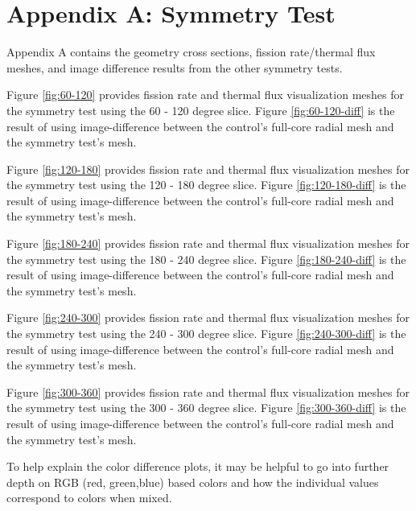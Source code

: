
\label{app}
\section{Appendix A: Symmetry Test}
Appendix A contains the geometry cross sections, fission rate/thermal flux meshes, and image difference results from the other symmetry tests.





Figure \ref{fig:60-120} provides fission rate and thermal flux visualization meshes for the symmetry test using the 60 - 120 degree slice.  Figure \ref{fig:60-120-diff} is the result of using image-difference between the control's full-core radial mesh and the symmetry test's mesh.




Figure \ref{fig:120-180} provides fission rate and thermal flux visualization meshes for the symmetry test using the 120 - 180 degree slice.  Figure \ref{fig:120-180-diff} is the result of using image-difference between the control's full-core radial mesh and the symmetry test's mesh.




Figure \ref{fig:180-240} provides fission rate and thermal flux visualization meshes for the symmetry test using the 180 - 240 degree slice.  Figure \ref{fig:180-240-diff} is the result of using image-difference between the control's full-core radial mesh and the symmetry test's mesh.




Figure \ref{fig:240-300} provides fission rate and thermal flux visualization meshes for the symmetry test using the 240 - 300 degree slice.  Figure \ref{fig:240-300-diff} is the result of using image-difference between the control's full-core radial mesh and the symmetry test's mesh.




Figure \ref{fig:300-360} provides fission rate and thermal flux visualization meshes for the symmetry test using the 300 - 360 degree slice.  Figure \ref{fig:300-360-diff} is the result of using image-difference between the control's full-core radial mesh and the symmetry test's mesh.

To help explain the color difference plots, it may be helpful to go into further depth on RGB (red, green,blue) based colors and how the individual values correspond to colors when mixed.

